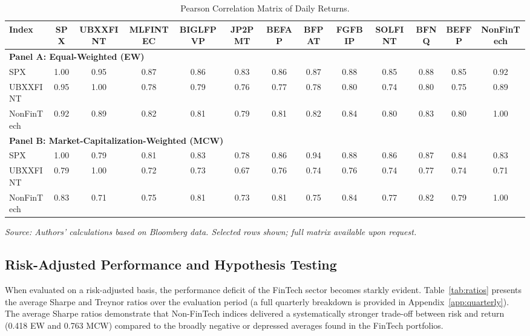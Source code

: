 \documentclass[12pt]{article}
\begin{document}
\begin{table}[htbp]
\centering
\caption{Pearson Correlation Matrix of Daily Returns.}\label{tab:corr}
\begin{adjustbox}{max width=\textwidth}
\begin{tabular}{lcccccccccccc}
\toprule
Index & SPX & UBXXFINT & MLFINTEC & BIGLFPVP & JP2PMT & BEFAP & BFPAT & FGFBIP & SOLFINT & BFNQ & BEFFP & NonFinTech \\
\midrule
\multicolumn{13}{l}{\textbf{Panel A: Equal-Weighted (EW)}} \\
\midrule
SPX & 1.00 & 0.95 & 0.87 & 0.86 & 0.83 & 0.86 & 0.87 & 0.88 & 0.85 & 0.88 & 0.85 & 0.92 \\
UBXXFINT & 0.95 & 1.00 & 0.78 & 0.79 & 0.76 & 0.77 & 0.78 & 0.80 & 0.74 & 0.80 & 0.75 & 0.89 \\
NonFinTech & 0.92 & 0.89 & 0.82 & 0.81 & 0.79 & 0.81 & 0.82 & 0.84 & 0.80 & 0.83 & 0.80 & 1.00 \\
\midrule
\multicolumn{13}{l}{\textbf{Panel B: Market-Capitalization-Weighted (MCW)}} \\
\midrule
SPX & 1.00 & 0.79 & 0.81 & 0.83 & 0.78 & 0.86 & 0.94 & 0.88 & 0.86 & 0.87 & 0.84 & 0.83 \\
UBXXFINT & 0.79 & 1.00 & 0.72 & 0.73 & 0.67 & 0.76 & 0.74 & 0.76 & 0.74 & 0.77 & 0.74 & 0.71 \\
NonFinTech & 0.83 & 0.71 & 0.75 & 0.81 & 0.73 & 0.81 & 0.75 & 0.84 & 0.77 & 0.82 & 0.79 & 1.00 \\
\bottomrule
\end{tabular}
\end{adjustbox}
\vspace{2pt}
{\footnotesize \textit{Source: Authors' calculations based on Bloomberg data. Selected rows shown; full matrix available upon request.}}
\end{table}

\subsection{Risk-Adjusted Performance and Hypothesis Testing}
When evaluated on a risk-adjusted basis, the performance deficit of the FinTech sector becomes starkly evident. Table~\ref{tab:ratios} presents the average Sharpe and Treynor ratios over the evaluation period (a full quarterly breakdown is provided in Appendix~\ref{app:quarterly}). The average Sharpe ratios demonstrate that Non-FinTech indices delivered a systematically stronger trade-off between risk and return (0.418 EW and 0.763 MCW) compared to the broadly negative or depressed averages found in the FinTech portfolios.
\end{document}
